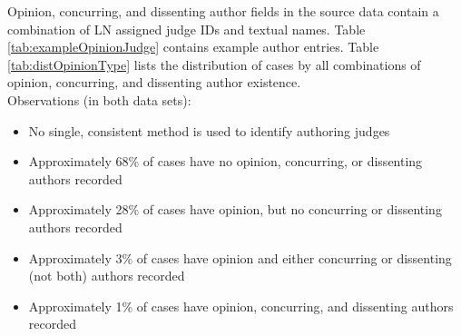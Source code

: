 \documentclass[10pt, letterpaper]{article}
\begin{document}
\begin{spacing}{1.0}
Opinion, concurring, and dissenting author fields in the source data contain a combination of LN assigned judge IDs and textual names.  Table \ref{tab:exampleOpinionJudge} contains example author entries.  Table \ref{tab:distOpinionType} lists the distribution of cases by all combinations of opinion, concurring, and dissenting author existence.\\

Observations (in both data sets):

\begin{itemize}\setlength\itemsep{1pt}
    \item No single, consistent method is used to identify authoring judges
    \item Approximately 68\% of cases have no opinion, concurring, or dissenting authors recorded
    \item Approximately 28\% of cases have opinion, but no concurring or dissenting authors recorded
    \item Approximately 3\% of cases have opinion and either concurring or dissenting (not both) authors recorded
    \item Approximately 1\% of cases have opinion, concurring, and dissenting authors recorded
\end{itemize}


\end{spacing}
\end{document}
